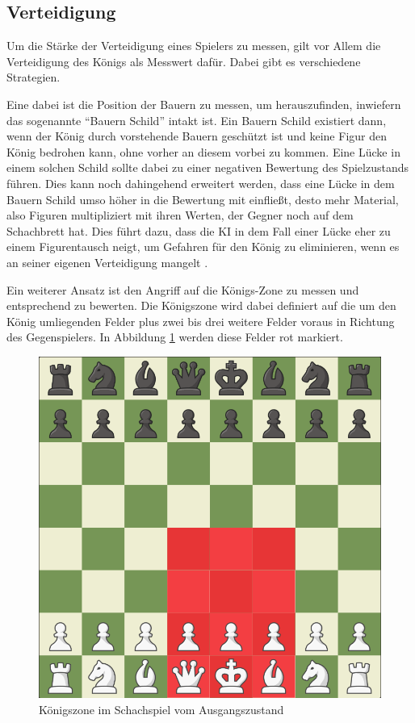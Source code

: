 
\subsection{Verteidigung}\label{defense_evaluation}

Um die Stärke der Verteidigung eines Spielers zu messen, gilt vor Allem die Verteidigung des Königs als Messwert dafür. Dabei gibt es verschiedene Strategien.

Eine dabei ist die Position der Bauern zu messen, um herauszufinden, inwiefern das sogenannte ``Bauern Schild'' intakt ist. Ein Bauern Schild existiert dann, wenn der König durch vorstehende Bauern geschützt ist und keine Figur den König bedrohen kann, ohne vorher an diesem vorbei zu kommen. Eine Lücke in einem solchen Schild sollte dabei zu einer negativen Bewertung des Spielzustands führen. Dies kann noch dahingehend erweitert werden, dass eine Lücke in dem Bauern Schild umso höher in die Bewertung mit einfließt, desto mehr Material, also Figuren multipliziert mit ihren Werten, der Gegner noch auf dem Schachbrett hat. Dies führt dazu, dass die KI in dem Fall einer Lücke eher zu einem Figurentausch neigt, um Gefahren für den König zu eliminieren, wenn es an seiner eigenen Verteidigung mangelt \cite{O.V.2019b}.

Ein weiterer Ansatz ist den Angriff auf die Königs-Zone zu messen und entsprechend zu bewerten. Die Königszone wird dabei definiert auf die um den König umliegenden Felder plus zwei bis drei weitere Felder voraus in Richtung des Gegenspielers. In Abbildung \ref{fig:king_zone} werden diese Felder rot markiert.

\begin{figure}[h]
\centering
\includegraphics[width=\textwidth/5*3]{images/king_zone.PNG}

\caption{Königszone im Schachspiel vom Ausgangszustand \cite{}}\label{fig:king_zone}
\end{figure}

